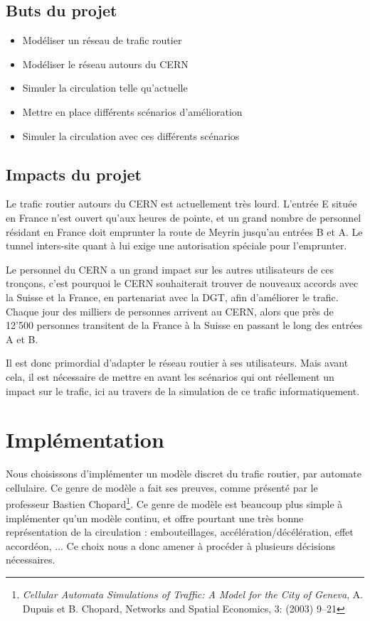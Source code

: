 \documentclass[a4paper,11pt, titlepage]{extarticle}
\begin{document}
\subsection{Buts du projet}

\begin{itemize}
\item Modéliser un réseau de trafic routier
\item Modéliser le réseau autours du CERN
\item Simuler la circulation telle qu'actuelle
\item Mettre en place différents scénarios d'amélioration
\item Simuler la circulation avec ces différents scénarios
\end{itemize}

\subsection{Impacts du projet}

Le trafic routier autours du CERN est actuellement très lourd. L'entrée E située en France n'est ouvert qu'aux heures de pointe, et un grand nombre de personnel résidant en France doit emprunter la route de Meyrin jusqu'au entrées B et A. Le tunnel inters-site quant à lui exige une autorisation spéciale pour l'emprunter.

Le personnel du CERN a un grand impact sur les autres utilisateurs de ces tronçons, c'est pourquoi le CERN souhaiterait trouver de nouveaux accords avec la Suisse et la France, en partenariat avec la DGT, afin d'améliorer le trafic. Chaque jour des milliers de personnes arrivent au CERN, alors que près de 12'500 personnes transitent de la France à la Suisse en passant le long des entrées A et B.

Il est donc primordial d'adapter le réseau routier à ses utilisateurs. Mais avant cela, il est nécessaire de mettre en avant les scénarios qui ont réellement un impact sur le trafic, ici au travers de la simulation de ce trafic informatiquement.

\newpage

\section{Implémentation}

Nous choisissons d'implémenter un modèle discret du trafic routier, par automate cellulaire. Ce genre de modèle a fait ses preuves, comme présenté par le professeur Bastien Chopard\footnote{\emph{Cellular Automata Simulations of Traffic:
A Model for the City of Geneva}, A. Dupuis et B. Chopard, Networks and Spatial Economics, 3: (2003) 9–21}. Ce genre de modèle est beaucoup plus simple à implémenter qu'un modèle continu, et offre pourtant une très bonne représentation de la circulation : embouteillages, accélération/décélération, effet accordéon, ... Ce choix nous a donc amener à procéder à plusieurs décisions nécessaires.
\end{document}
